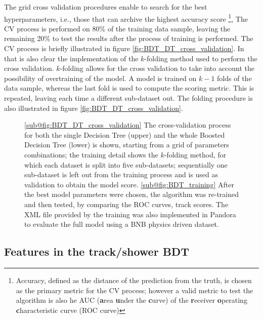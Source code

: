 The grid cross validation procedures enable to search for the best hyperparameters, i.e., those that can archive the highest accuracy score \footnote{Accuracy, defined as the distance of the prediction from the truth, is chosen as the primary metric for the CV process; however a valid metric to test the algorithm is also he AUC (\textbf{a}rea \textbf{u}nder the \textbf{c}urve) of the \textbf{r}eceiver \textbf{o}perating \textbf{c}haracteristic curve (ROC curve)}, The CV process is performed on 80\% of the training data sample, leaving the remaining 20\% to test the results after the process of training is performed. The CV process is briefly illustrated in figure \ref{fig:BDT_DT_cross_validation}. In that is also clear the implementation of the $k$-folding method used to perform the cross validation. $k$-folding allows for the cross validation to take into account the possibility of overtraining of the model. A model is trained on $k-1$ folds of the data sample, whereas the last fold is used to compute the scoring metric. This is repeated, leaving each time a different sub-dataset out. The folding procedure is also illustrated in figure \ref{fig:BDT_DT_cross_validation}. 

\begin{figure*}
    \hfill
    \hfill
    \hfill
    \phantom{.}
    \caption{\ref{sub@fig:BDT_DT_cross_validation} The cross-validation process for both the single Decision Tree (upper) and the whole Boosted Decision Tree (lower) is shown, starting from a grid of parameters combinations; the training detail shows the $k$-folding method, for which each dataset is split into five sub-datasets; sequentially one sub-dataset is left out from the training process and is used as validation to obtain the model score. \ref{sub@fig:BDT_training} After the best model parameters were chosen, the algorithm was re-trained and then tested, by comparing the ROC curves, track scores. The XML file provided by the training was also implemented in Pandora to evaluate the full model using a BNB physics driven dataset.}
    \label{fig:BDT_DT}
\end{figure*}

\subsection{Features in the track/shower BDT}

